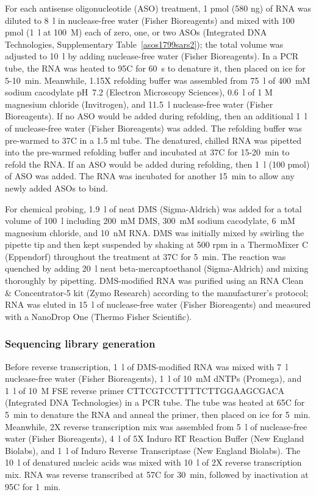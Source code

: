 \documentclass[main.tex]{subfiles}
\begin{document}
For each antisense oligonucleotide (ASO) treatment, 1 pmol (580 ng) of RNA was diluted to 8~\textmu l in nuclease-free water (Fisher Bioreagents) and mixed with 100 pmol (1~\textmu l at 100~\textmu M) each of zero, one, or two ASOs (Integrated DNA Technologies, Supplementary Table~\ref{asos1799sars2}); the total volume was adjusted to 10~\textmu l by adding nuclease-free water (Fisher Bioreagents).
In a PCR tube, the RNA was heated to 95\textdegree C for 60~s to denature it, then placed on ice for 5-10~min.
Meanwhile, 1.15X refolding buffer was assembled from 75~\textmu l of 400~mM sodium cacodylate pH~7.2 (Electron Microscopy Sciences), 0.6~\textmu l of 1 M magnesium chloride (Invitrogen), and 11.5~\textmu l nuclease-free water (Fisher Bioreagents).
If no ASO would be added during refolding, then an additional 1~\textmu l of nuclease-free water (Fisher Bioreagents) was added.
The refolding buffer was pre-warmed to 37\textdegree C in a 1.5 ml tube.
The denatured, chilled RNA was pipetted into the pre-warmed refolding buffer and incubated at 37\textdegree C for 15-20~min to refold the RNA.
If an ASO would be added during refolding, then 1~\textmu l (100 pmol) of ASO was added.
The RNA was incubated for another 15~min to allow any newly added ASOs to bind.

For chemical probing, 1.9~\textmu l of neat DMS (Sigma-Aldrich) was added for a total volume of 100~\textmu l including 200~mM DMS, 300~mM sodium cacodylate, 6~mM magnesium chloride, and 10~nM RNA.
DMS was initially mixed by swirling the pipette tip and then kept suspended by shaking at 500 rpm in a ThermoMixer C (Eppendorf) throughout the treatment at 37\textdegree C for 5~min.
The reaction was quenched by adding 20~\textmu l neat beta-mercaptoethanol (Sigma-Aldrich) and mixing thoroughly by pipetting.
DMS-modified RNA was purified using an RNA Clean \& Concentrator-5 kit (Zymo Research) according to the manufacturer's protocol; RNA was eluted in 15~\textmu l of nuclease-free water (Fisher Bioreagents) and measured with a NanoDrop One (Thermo Fisher Scientific).

\subsubsection{Sequencing library generation}

Before reverse transcription, 1~\textmu l of DMS-modified RNA was mixed with 7~\textmu l nuclease-free water (Fisher Bioreagents), 1~\textmu l of 10~mM dNTPs (Promega), and 1~\textmu l of 10~\textmu M FSE reverse primer CTTCGTCCTTTTCTTGGAAGCGACA (Integrated DNA Technologies) in a PCR tube.
The tube was heated at 65\textdegree C for 5~min to denature the RNA and anneal the primer, then placed on ice for 5~min.
Meanwhile, 2X reverse transcription mix was assembled from 5~\textmu l of nuclease-free water (Fisher Bioreagents), 4~\textmu l of 5X Induro RT Reaction Buffer (New England Biolabs), and 1~\textmu l of Induro Reverse Transcriptase (New England Biolabs).
The 10~\textmu l of denatured nucleic acids was mixed with 10~\textmu l of 2X reverse transcription mix.
RNA was reverse transcribed at 57\textdegree C for 30~min, followed by inactivation at 95\textdegree C for 1~min.
\end{document}
